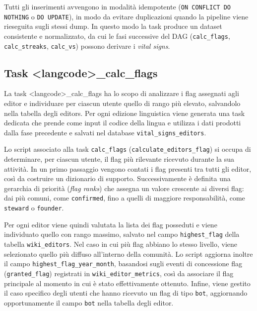 Tutti gli inserimenti avvengono in modalità idempotente (\texttt{ON CONFLICT DO NOTHING} o \texttt{DO UPDATE}), in modo da evitare duplicazioni quando la pipeline viene rieseguita sugli stessi dump. 
In questo modo la task produce un dataset consistente e normalizzato, da cui le fasi successive del DAG (\texttt{calc\_flags}, \texttt{calc\_streaks}, \texttt{calc\_vs}) possono derivare i \emph{vital signs}.


\subsection{Task \textless langcode\textgreater\_calc\_flags}
\label{subsec:calc_flags}

La task \textless langcode\textgreater\_calc\_flags ha lo scopo di analizzare i flag assegnati agli editor
e individuare per ciascun utente quello di rango più elevato,
salvandolo nella tabella degli editors.
Per ogni edizione linguistica viene generata una task dedicata che prende come input il codice della lingua e utilizza i dati prodotti dalla fase precedente e salvati nel database \texttt{vital\_signs\_editors}.

Lo script associato alla task \texttt{calc\_flags} (\texttt{calculate\_editors\_flag}) si occupa di determinare, per ciascun utente, il flag più rilevante ricevuto durante la sua attività. In un primo passaggio vengono contati i flag presenti tra tutti gli editor, così da costruire un dizionario di supporto. Successivamente è definita una gerarchia di priorità (\emph{flag ranks}) che assegna un valore crescente ai diversi flag: dai più comuni, come \texttt{confirmed}, fino a quelli di maggiore responsabilità, come \texttt{steward} o \texttt{founder}.

Per ogni editor viene quindi valutata la lista dei flag posseduti e viene individuato quello con rango massimo, salvato nel campo \texttt{highest\_flag} della tabella \texttt{wiki\_editors}. Nel caso in cui più flag abbiano lo stesso livello, viene selezionato quello più diffuso all’interno della comunità. Lo script aggiorna inoltre il campo \texttt{highest\_flag\_year\_month}, basandosi sugli eventi di concessione flag (\texttt{granted\_flag}) registrati in \texttt{wiki\_editor\_metrics}, così da associare il flag principale al momento in cui è stato effettivamente ottenuto. Infine, viene gestito il caso specifico degli utenti che hanno ricevuto un flag di tipo \texttt{bot}, aggiornando opportunamente il campo \texttt{bot} nella tabella degli editor.

